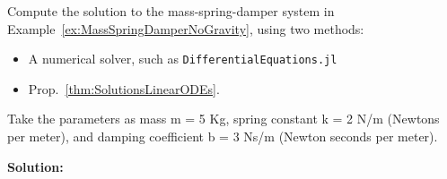 \bigskip

\begin{center}
\setlength{\fboxrule}{2pt}  %
\end{center}


\bigskip

\begin{example} 
\label{ex:MassSpringDamperCompareSolutionMethods}
Compute the solution to the mass-spring-damper system in Example~\ref{ex:MassSpringDamperNoGravity}, using two methods:
\begin{itemize}
    \item A numerical solver, such as \texttt{DifferentialEquations.jl}
    \item Prop.~\ref{thm:SolutionsLinearODEs}.
\end{itemize}
Take the parameters as mass m = 5 Kg, spring constant k = 2 N/m (Newtons per meter), and damping coefficient b = 3 Ns/m (Newton seconds per meter). 
\end{example}
\textbf{Solution:}


